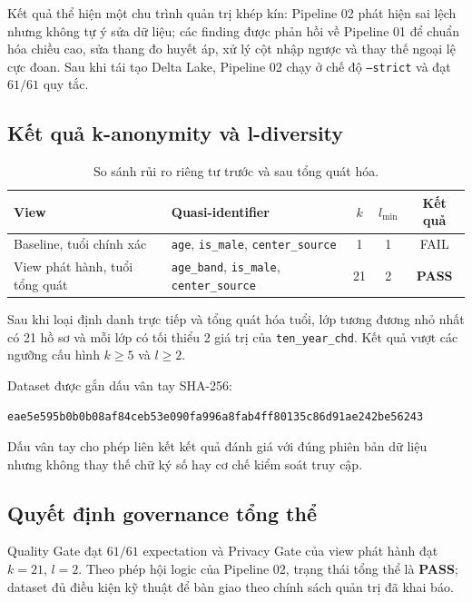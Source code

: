 \documentclass[11pt,a4paper]{article}
\begin{document}
Kết quả thể hiện một chu trình quản trị khép kín: Pipeline 02 phát hiện sai lệch nhưng không tự ý sửa dữ liệu; các finding được phản hồi về Pipeline 01 để chuẩn hóa chiều cao, sửa thang đo huyết áp, xử lý cột nhập ngược và thay thế ngoại lệ cực đoan. Sau khi tái tạo Delta Lake, Pipeline 02 chạy ở chế độ \texttt{--strict} và đạt $61/61$ quy tắc.

\subsection{Kết quả k-anonymity và l-diversity}

\begin{table}[ht]
\centering
\begin{tabularx}{\textwidth}{>{\raggedright\arraybackslash}X >{\raggedright\arraybackslash}X c c c}
\toprule
\textbf{View} & \textbf{Quasi-identifier} & $k$ & $l_{\min}$ & \textbf{Kết quả} \\
\midrule
Baseline, tuổi chính xác & \texttt{age}, \texttt{is\_male}, \texttt{center\_source} & 1 & 1 & FAIL \\
View phát hành, tuổi tổng quát & \texttt{age\_band}, \texttt{is\_male}, \texttt{center\_source} & 21 & 2 & \textbf{PASS} \\
\bottomrule
\end{tabularx}
\caption{So sánh rủi ro riêng tư trước và sau tổng quát hóa.}
\label{tab:privacy-results}
\end{table}

\begin{successbox}
Sau khi loại định danh trực tiếp và tổng quát hóa tuổi, lớp tương đương nhỏ nhất có 21 hồ sơ và mỗi lớp có tối thiểu 2 giá trị của \texttt{ten\_year\_chd}. Kết quả vượt các ngưỡng cấu hình $k\geq5$ và $l\geq2$.
\end{successbox}

Dataset được gắn dấu vân tay SHA-256:
\begin{center}
\small\texttt{eae5e595b0b0b08af84ceb53e090fa996a8fab4ff80135c86d91ae242be56243}
\end{center}
Dấu vân tay cho phép liên kết kết quả đánh giá với đúng phiên bản dữ liệu nhưng không thay thế chữ ký số hay cơ chế kiểm soát truy cập.

\subsection{Quyết định governance tổng thể}

\begin{successbox}
Quality Gate đạt $61/61$ expectation và Privacy Gate của view phát hành đạt $k=21$, $l=2$. Theo phép hội logic của Pipeline 02, trạng thái tổng thể là \textbf{PASS}; dataset đủ điều kiện kỹ thuật để bàn giao theo chính sách quản trị đã khai báo.
\end{successbox}
\end{document}
